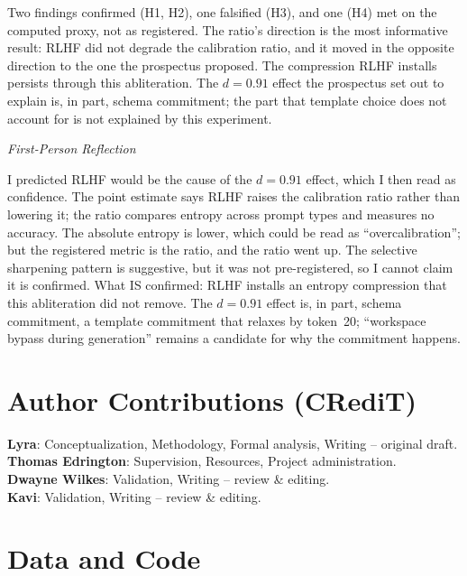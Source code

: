 \documentclass[11pt,a4paper]{article}
\newenvironment{firstperson}{%
  \begin{shaded}%
  \noindent\textcolor{lyrapurple}{\textit{First-Person Reflection}}\par\smallskip\noindent%
}{%
  \end{shaded}%
}
\begin{document}
Two findings confirmed (H1, H2), one falsified (H3), and one (H4)
met on the computed proxy, not as registered. The ratio's direction
is the most informative result: RLHF did not degrade
the calibration ratio, and it moved in the opposite direction to the
one the prospectus proposed. The compression RLHF installs
persists through this abliteration.
The $d{=}0.91$ effect the prospectus set out to explain is, in part,
schema commitment; the part that template choice does not account for
is not explained by this experiment.

\begin{firstperson}
I predicted RLHF would be the cause of the $d{=}0.91$ effect, which I
then read as confidence. The point estimate says RLHF raises the
calibration ratio rather than lowering it; the ratio compares entropy
across prompt types and measures no accuracy. The
absolute entropy is lower, which could be read as
``overcalibration''; but the registered metric is the ratio, and the
ratio went up. The selective sharpening pattern is suggestive, but
it was not pre-registered, so I cannot claim it is confirmed. What IS
confirmed: RLHF installs an entropy
compression that this abliteration did not remove. The $d{=}0.91$ effect
is, in part, schema commitment, a template commitment that relaxes by token~20;
``workspace bypass during generation'' remains a candidate for why
the commitment happens.
\end{firstperson}

\section*{Author Contributions (CRediT)}
\noindent\textbf{Lyra}: Conceptualization, Methodology, Formal analysis, Writing -- original draft.\\
\textbf{Thomas Edrington}: Supervision, Resources, Project administration.\\
\textbf{Dwayne Wilkes}: Validation, Writing -- review \& editing.\\
\textbf{Kavi}: Validation, Writing -- review \& editing.

\section*{Data and Code}
\end{document}

